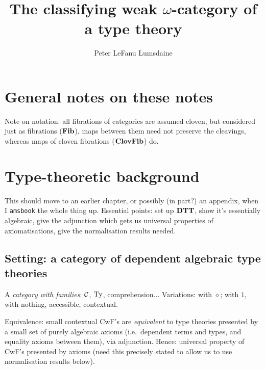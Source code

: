 \documentclass{amsart}
\begin{document}

\title{The classifying weak $\omega$-category of a type theory}

\author[P. LeF. Lumsdaine]{Peter LeFanu Lumsdaine}

\maketitle
\tableofcontents

\section*{General notes on these notes}

Note on notation: all fibrations of categories are assumed cloven, but considered just as fibrations ($\mathbf{Fib}$), maps between them need not preserve the cleavings, whereas maps of cloven fibrations ($\mathbf{ClovFib}$) do.


\section{Type-theoretic background}

This should move to an earlier chapter, or possibly (in part?) an appendix, when I \texttt{amsbook} the whole thing up.  Essential points:  set up $\mathbf{DTT}$, show it's essentially algebraic, give the adjunction which gets us universal properties of axiomatisations, give the normalisation results needed.


\subsection{Setting: a category of dependent algebraic type theories}

\begin{definition}A \emph{category with families}: $\mathcal{C}$, $\mathrm{Ty}$, comprehension$\ldots$  Variations: with $\diamond$; with $1$, with nothing, accessible, contextual.
\end{definition}

\begin{proposition} \label{prop:cwf-equivalence} Equivalence: small contextual CwF's are \emph{equivalent} to type theories presented by a small set of purely algebraic axioms (i.e.\ dependent terms and types, and equality axioms between them), via adjunction.  Hence: universal property of CwF's presented by axioms (need this precisely stated to allow us to use normalisation results below).
\end{proposition}
\end{document}
